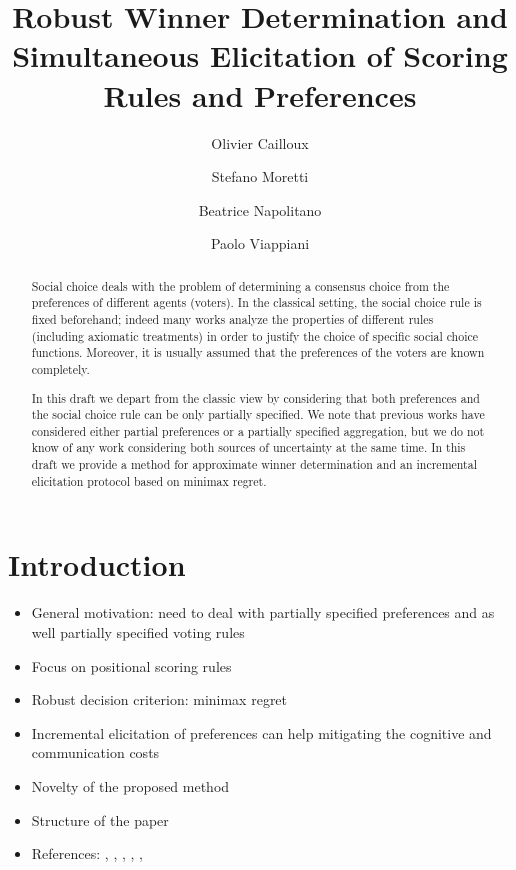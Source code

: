 \documentclass[12pt]{article}
\title{Robust Winner Determination and Simultaneous Elicitation of Scoring Rules and Preferences}
\author{Olivier Cailloux \and Stefano Moretti \and Beatrice Napolitano \and Paolo Viappiani} %
\begin{document}
\maketitle

\begin{abstract}
Social choice deals with the problem of determining a consensus choice from the preferences of different agents (voters).
In the classical setting, the social choice rule is fixed beforehand; indeed many works analyze the properties of different rules (including axiomatic treatments) in order to justify the choice of specific social choice functions. 
Moreover, it is usually assumed that the preferences of the voters are known completely. 

In this draft we depart from the classic view by considering that both preferences and the social choice rule can be only partially specified.
We note that previous works have considered either partial preferences or a partially specified aggregation, but we do not know of any work considering both sources of uncertainty at the same time.
In this draft we provide a method for approximate winner determination and an incremental elicitation protocol based on minimax regret. 
\end{abstract}

\section{Introduction}

\begin{itemize}
\item General motivation: need to deal with partially specified preferences and as well partially specified voting rules
\item Focus on positional scoring rules
\item Robust decision criterion: minimax regret
\item Incremental elicitation of preferences can help mitigating the cognitive and communication costs
\item Novelty of the proposed method
\item Structure of the paper
\item References: \cite{Cailloux2014}, \cite{Llamazares2013}, \cite{Konczak05}, \cite{Kalech2011}, \cite{Pini2009}, \cite{Xia2008}
\end{itemize}
\end{document}
